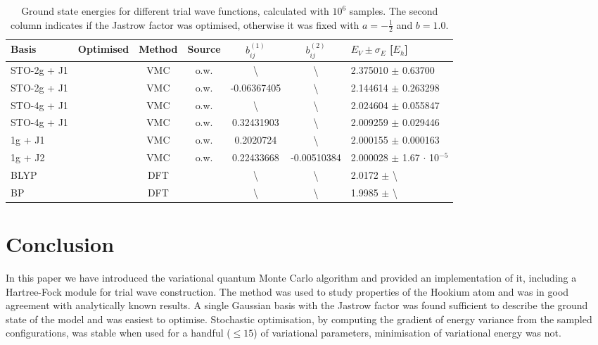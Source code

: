 \documentclass[final,3p,times,twocolumn]{elsarticle}
\newcommand{\cmark}{\ding{51}}%
\newcommand{\xmark}{\ding{55}}%
\begin{document}
	\begin{table}
		\centering
		\begin{tabular}{@{}lcccccl@{}} 
			\toprule
			Basis & Optimised & Method & Source & $b^{(1)}_{ij}$ & $b^{(2)}_{ij}$ & $E_V \pm \sigma_E$ [$E_h$]\\ \midrule
			STO-2g + J1 & \xmark & VMC & o.w. & \textbackslash & \textbackslash & 2.375010 $\pm$ 0.63700 \\ 
			STO-2g + J1 & \cmark & VMC & o.w. & -0.06367405 & \textbackslash & 2.144614 $\pm$ 0.263298\\ 
			STO-4g + J1 & \xmark & VMC & o.w. & \textbackslash & \textbackslash & 2.024604 $\pm$ 0.055847 \\ 
			STO-4g + J1 & \cmark & VMC & o.w. & 0.32431903 & \textbackslash & 2.009259 $\pm$ 0.029446\\ 
			1g + J1 	& \cmark & VMC & o.w. & 0.2020724 & \textbackslash & 2.000155 $\pm$ 0.000163\\ 
			1g + J2 	& \cmark & VMC & o.w. & 0.22433668 & -0.00510384 & 2.000028 $\pm$ 1.67 $\cdot$ 10$^{-5}$\\
			BLYP 		& \xmark & DFT & \cite{kais1993density} & \textbackslash & \textbackslash & 2.0172 $\pm$ \textbackslash \\ 
			BP			& \xmark & DFT & \cite{kais1993density} & \textbackslash & \textbackslash & 1.9985 $\pm$ \textbackslash \\ 
			\bottomrule
		\end{tabular}
		\caption{\label{tab:VMCenergies}Ground state energies for different trial wave functions, calculated with $10^6$ samples. The second column indicates if the Jastrow factor was optimised, otherwise it was fixed with $a=-\frac{1}{2}$ and $b=1.0$.}
	\end{table}
	
	\section{Conclusion}
	\label{sec:conclusion}
	In this paper we have introduced the variational quantum Monte Carlo algorithm and provided an implementation of it, including a Hartree-Fock module for trial wave construction. The method was used to study properties of the Hookium atom and was in good agreement with analytically known results. A single Gaussian basis with the Jastrow factor was found sufficient to describe the ground state of the model and was easiest to optimise. Stochastic optimisation, by computing the gradient of energy variance from the sampled configurations, was stable when used for a handful ($\leq 15$) of variational parameters, minimisation of variational energy was not. 
\end{document}
